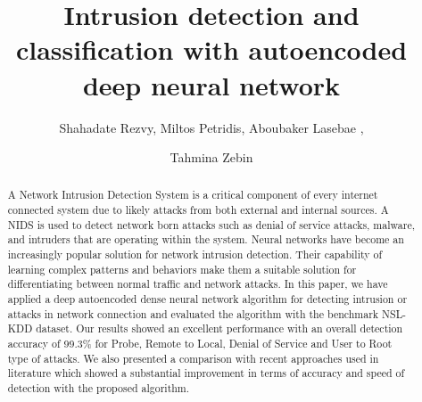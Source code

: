 \documentclass[runningheads]{llncs}
\begin{document}
\thispagestyle{empty} %
\pagestyle{empty}

\title{Intrusion detection and classification with autoencoded deep neural network}
%
%
\author{Shahadate Rezvy, Miltos Petridis, Aboubaker Lasebae , \and
Tahmina Zebin  }
%
%
%
\maketitle              %
%
\begin{abstract}
A Network Intrusion Detection System  is a critical component of every internet connected system due to likely attacks from both external and internal sources. A NIDS is used to detect network born attacks such as denial of service attacks, malware, and intruders that are operating within the system. Neural networks have become an increasingly popular
solution for network intrusion detection. Their capability of learning complex patterns and behaviors make them a suitable solution for differentiating between normal traffic and network attacks. In this paper, we have applied a deep autoencoded dense neural network algorithm for detecting intrusion or attacks in network connection and evaluated the algorithm with the benchmark NSL-KDD dataset. Our  results  showed  an  excellent  performance  with  an overall  detection  accuracy  of  99.3\%  for  Probe,  Remote to Local,  Denial of Service and  User to Root type  of attacks. We also presented a comparison with recent approaches used in literature which showed a substantial improvement in terms of accuracy and speed of detection with the proposed algorithm.

\end{abstract}
\end{document}
